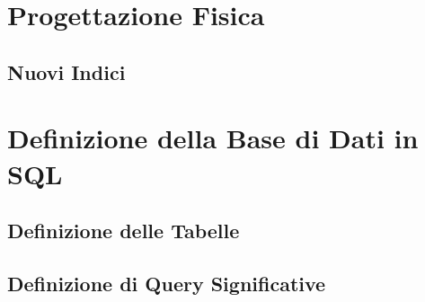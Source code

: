 \documentclass{article}
\begin{document}

% 
% 
% 
% 
% 
% 




\clearpage
\section{Progettazione Fisica}
\subsection{Nuovi Indici}



\clearpage
\section{Definizione della Base di Dati in SQL}
\subsection{Definizione delle Tabelle}
\subsection{Definizione di Query Significative}
\end{document}
